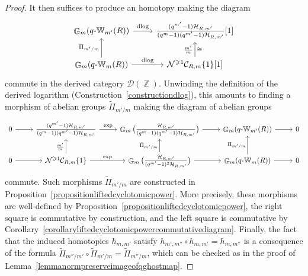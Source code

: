 \documentclass[10pt,twoside]{scrarticle}
\theoremstyle{definition}
\DeclareMathOperator{\Z}{\mathbb{Z}}
\DeclareMathOperator{\G}{\mathbb{G}}
\newcommand{\CRm}{\mathcal{C}_{R,m}}
\newcommand{\qWm}{q\text{-}\mathbb{W}_m}
\newcommand{\qWmm}{q\text{-}\mathbb{W}_{m'}}
\renewcommand{\ge}{\geqslant}
\newcommand{\dlog}{\mathrm{dlog}}
\numberwithin{equation}{theorem}
\begin{document}
\begin{proof}
    It then suffices to produce an homotopy making the diagram
    $$\begin{tikzcd}
        \G_m(\qWmm(R)) \ar[r,"\dlog"] & {\frac{(q^{m'}-1)\mathcal{H}_{R,m'}}{(q^{m}-1)(q^{m'}-1)\mathcal{H}_{R,m'}}}[1] \\
        \G_m(\qWm(R)) \ar[u,"\Pi_{m'/m}"] \ar[r,"\dlog"] & \mathcal{N}^{\ge 1}\CRm\{1\}[1] \ar[u,"\frac{m'}{m}","\cong"']
    \end{tikzcd}$$
    commute in the derived category $\mathcal{D}(\Z)$. Unwinding the definition of the derived logarithm (Construction~\ref{constructiondlog}), this amounts to finding a morphism of abelian groups $\tilde{\Pi}_{m'/m}$ making the diagram of abelian groups
    $$\begin{tikzcd}
        0 \ar[r] & {\frac{(q^{m'}-1)\mathcal{H}_{R,m'}}{(q^{m}-1)(q^{m'}-1)\mathcal{H}_{R,m'}}} \ar[r,"\exp"] & \G_m\big({\frac{\mathcal{H}_{R,m'}}{(q^{m}-1)(q^{m'}-1)\mathcal{H}_{R,m'}}}\big) \ar[r] & \G_m(\qWmm(R)) \ar[r] & 0 \\
        0 \ar[r] & \mathcal{N}^{\ge 1}\CRm\{1\} \ar[r,"\exp"] \ar[u,"\frac{m'}{m}"] & \G_m\big({\frac{\mathcal{H}_{R,m'}}{(q^{m'}-1)^2\mathcal{H}_{R,m'}}}\big) \ar[r] \ar[u,"\tilde{\Pi}_{m'/m}"] & \G_m(\qWm(R)) \ar[u,"\Pi_{m'/m}"] \ar[r] & 0
    \end{tikzcd}$$
    commute. Such morphisms $\tilde{\Pi}_{m'/m}$ are constructed in Proposition~\ref{propositionliftedcyclotomicpower}. More precisely, these morphisms are well-defined by Proposition~\ref{propositionliftedcyclotomicpower}, the right square is commutative by construction, and the left square is commutative by Corollary~\ref{corollaryliftedcyclotomicpowercommutativediagram}. Finally, the fact that the induced homotopies $h_{m,m'}$ satisfy $h_{m',m''} \circ h_{m,m'} = h_{m,m''}$ is a consequence of the formula $\tilde{\Pi}_{m''/m'} \circ \tilde{\Pi}_{m'/m} = \tilde{\Pi}_{m''/m}$, which can be checked as in the proof of Lemma~\ref{lemmanormpreserveimageofqghostmap}.
\end{proof}
\end{document}
